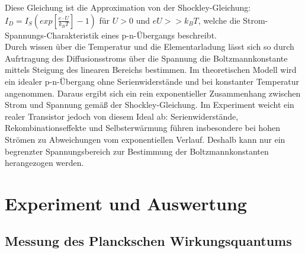 \documentclass[a4paper,10pt,twocolumn]{scrartcl} %
\begin{document}
		Diese Gleichung ist die Approximation von der Shockley-Gleichung: $I_D = I_S(exp[\frac{e\cdot U}{k_B T}]-1)$ für $U>0$ und $eU>>k_B T$, welche die Strom-Spannungs-Charakteristik eines p-n-Übergangs beschreibt.
		\\
		Durch wissen über die Temperatur und die Elementarladung lässt sich so durch Aufrtragung des 
		Diffusionsstroms über die Spannung die Boltzmannkonstante mittels Steigung des linearen Bereichs bestimmen.
		Im theoretischen Modell wird ein idealer p-n-Übergang ohne Serienwiderstände und bei konstanter Temperatur angenommen. 
		Daraus ergibt sich ein rein exponentieller Zusammenhang zwischen Strom und Spannung gemäß der Shockley-Gleichung. 
		Im Experiment weicht ein realer Transistor jedoch von diesem Ideal ab: Serienwiderstände, Rekombinationseffekte und Selbsterwärmung führen insbesondere bei hohen Strömen zu Abweichungen vom exponentiellen Verlauf. 
		Deshalb kann nur ein begrenzter Spannungsbereich zur Bestimmung der Boltzmannkonstanten herangezogen werden.

\section{Experiment und Auswertung}
	\subsection{Messung des Planckschen Wirkungsquantums}
\end{document}
